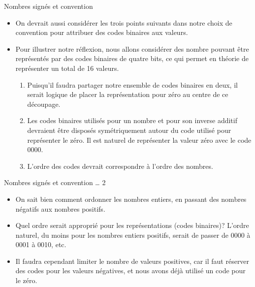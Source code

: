 \documentclass[presentation]{beamer}
\begin{document}
\begin{frame}[label={sec:org7eaf0b6}]{Nombres signés et convention}
\begin{itemize}
\item On devrait aussi considérer les trois points suivants dans notre choix de convention pour attribuer des codes binaires aux valeurs.

\item Pour illustrer notre réflexion, nous allons considérer des nombre pouvant être représentés par des codes binaires de quatre bits, ce qui permet en théorie de représenter un total de 16 valeurs.

\begin{enumerate}
\item Puisqu'il faudra partager notre ensemble de codes binaires en deux, il serait logique de placer la représentation pour zéro au centre de ce découpage.

\item Les codes binaires utilisés pour un nombre et pour son inverse additif devraient être disposés symétriquement autour du code utilisé pour représenter le zéro. Il est naturel de représenter la valeur zéro avec le code 0000.

\item L'ordre des codes devrait correspondre à l'ordre des nombres.
\end{enumerate}
\end{itemize}
\end{frame}

\begin{frame}[label={sec:org7427079}]{Nombres signés et convention \ldots{} 2}
\begin{itemize}
\item On sait bien comment ordonner les nombres entiers, en passant des nombres négatifs aux nombres positifs.

\item Quel ordre serait approprié pour les représentations (codes binaires)?  L'ordre naturel, du moins pour les nombres entiers positifs, serait de passer de 0000 à 0001 à 0010, etc.

\item Il faudra cependant limiter le nombre de valeurs positives, car il faut réserver des codes pour les valeurs négatives, et nous avons déjà utilisé un code pour le zéro.
\end{itemize}
\end{frame}
\end{document}

